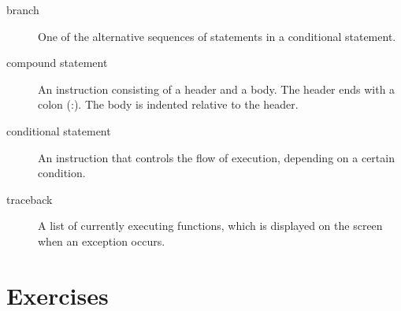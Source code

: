  

\begin{description}
\item[branch]
One of the alternative sequences of statements in a conditional statement.
\end{description}


\begin{description}
\item[compound statement]
An instruction consisting of a header and a body. The header ends with a colon (:). The body is indented relative to the header.
\end{description}

 

\begin{description}
\item[conditional statement]
An instruction that controls the flow of execution, depending on a certain condition.
\end{description}

 

\begin{description}
\item[traceback]
A list of currently executing functions, which is displayed on the screen when an exception occurs.
\end{description}




\hypertarget{ejercicios}{%
\section*{Exercises}\label{ejercicios}}

